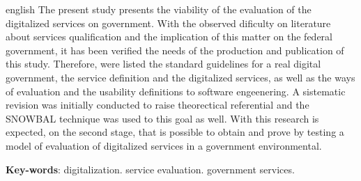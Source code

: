 \begin{resumo}[Abstract]
 \begin{otherlanguage*}{english}
   The present study presents the viability of the evaluation of the digitalized services on government. With the observed dificulty on literature about services qualification and the implication of this matter on the federal government, it has been verified the needs of the production and publication of this study. Therefore, were listed the standard guidelines for a real digital government, the service definition and the digitalized services, as well as the ways of evaluation and the usability definitions to software engeenering. A sistematic revision was initially conducted to raise theorectical referential and the SNOWBAL technique was used to this goal as well. With this research is expected, on the second stage, that is possible to obtain and prove by testing a model of evaluation of digitalized services in a government environmental.

   \vspace{\onelineskip}
 
   \noindent 
   \textbf{Key-words}: digitalization. service evaluation. government services.
 \end{otherlanguage*}
\end{resumo}
